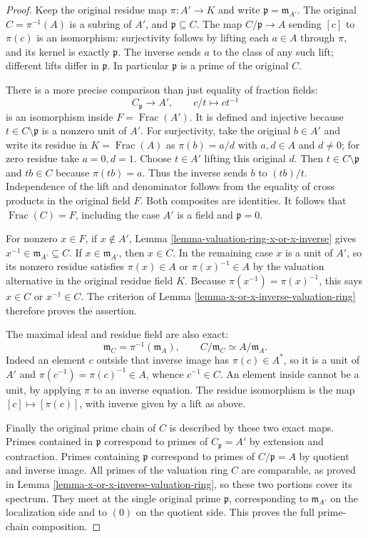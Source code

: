 \begin{proof}
Keep the original residue map
$\pi:A'\to K$ and write
$\mathfrak p=\mathfrak m_{A'}$.
The original $C=\pi^{-1}(A)$
is a subring of $A'$,
and $\mathfrak p\subseteq C$.
The map $C/\mathfrak p\to A$
sending $[c]$ to $\pi(c)$
is an isomorphism: surjectivity
follows by lifting each $a\in A$
through $\pi$, and its kernel
is exactly $\mathfrak p$.
The inverse sends $a$ to
the class of any such lift;
different lifts differ in
$\mathfrak p$. In particular
$\mathfrak p$ is a prime
of the original $C$.

There is a more precise
comparison than just equality
of fraction fields:
$$
C_{\mathfrak p}\longrightarrow A',\qquad c/t\longmapsto c t^{-1}
$$
is an isomorphism inside
$F=\operatorname{Frac}(A')$.
It is defined and injective
because $t\in C\setminus\mathfrak p$
is a nonzero unit of $A'$.
For surjectivity, take the
original $b\in A'$ and
write its residue in
$K=\operatorname{Frac}(A)$
as $\pi(b)=a/d$ with
$a,d\in A$ and $d\neq0$;
for zero residue take $a=0,d=1$.
Choose $t\in A'$ lifting
this original $d$. Then
$t\in C\setminus\mathfrak p$
and $tb\in C$ because
$\pi(tb)=a$. Thus the
inverse sends $b$ to
$(tb)/t$. Independence of
the lift and denominator
follows from the equality
of cross products in the
original field $F$. Both
composites are identities.
It follows that
$\operatorname{Frac}(C)=F$,
including the case $A'$ is
a field and $\mathfrak p=0$.

For nonzero $x\in F$, if
$x\notin A'$, Lemma
\ref{lemma-valuation-ring-x-or-x-inverse}
gives $x^{-1}\in\mathfrak m_{A'}\subseteq C$.
If $x\in\mathfrak m_{A'}$,
then $x\in C$. In the
remaining case $x$ is a
unit of $A'$, so its
nonzero residue satisfies
$\pi(x)\in A$ or
$\pi(x)^{-1}\in A$ by the
valuation alternative in the
original residue field $K$.
Because $\pi(x^{-1})=\pi(x)^{-1}$,
this says $x\in C$ or
$x^{-1}\in C$. The criterion
of Lemma
\ref{lemma-x-or-x-inverse-valuation-ring}
therefore proves the assertion.

The maximal ideal and residue
field are also exact:
$$
\mathfrak m_C=\pi^{-1}(\mathfrak m_A),\qquad
C/\mathfrak m_C\simeq A/\mathfrak m_A.
$$
Indeed an element $c$ outside
that inverse image has
$\pi(c)\in A^*$, so it
is a unit of $A'$ and
$\pi(c^{-1})=\pi(c)^{-1}\in A$,
whence $c^{-1}\in C$.
An element inside cannot be
a unit, by applying $\pi$
to an inverse equation.
The residue isomorphism is
the map $[c]\mapsto[\pi(c)]$,
with inverse given by a
lift as above.

Finally the original prime
chain of $C$ is described
by these two exact maps.
Primes contained in $\mathfrak p$
correspond to primes of
$C_{\mathfrak p}=A'$ by
extension and contraction.
Primes containing $\mathfrak p$
correspond to primes of
$C/\mathfrak p=A$ by
quotient and inverse image.
All primes of the valuation
ring $C$ are comparable,
as proved in Lemma
\ref{lemma-x-or-x-inverse-valuation-ring},
so these two portions cover
its spectrum. They meet
at the single original prime
$\mathfrak p$, corresponding
to $\mathfrak m_{A'}$ on
the localization side and
to $(0)$ on the quotient
side. This proves the full
prime-chain composition.
\end{proof}

